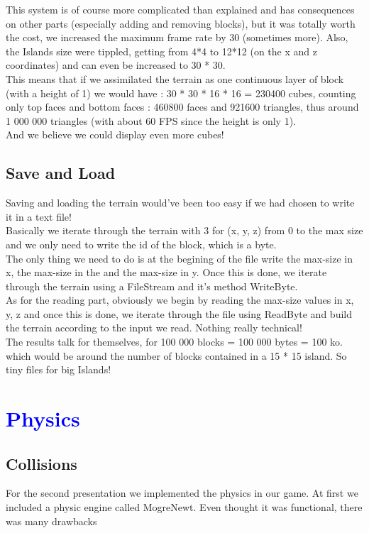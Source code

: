 \documentclass[article]{report}         %
\begin{document}
          This system is of course more complicated than explained and has consequences on other parts (especially adding and removing blocks), but it was totally worth the cost, we increased the maximum  frame rate by 30 (sometimes more). Also, the Islands size were tippled, getting from 4*4 to 12*12 (on the x and z coordinates) and can even be increased to 30 * 30.\\
          This means that if we assimilated the terrain as one continuous layer of block (with a height of 1) we would have : 30 * 30 * 16 * 16 = 230400 cubes, counting only top faces and bottom faces : 460800 faces and 921600 triangles, thus around 1 000 000 triangles (with about 60 FPS since the height is only 1).\\
          And we believe we could display even more cubes!\\

      \section{Save and Load}
        Saving and loading the terrain would've been too easy if we had chosen to write it in a text file!\\
        Basically we iterate through the terrain with 3 for (x, y, z) from 0 to the max size and we only need to write the id of the block, which is a byte.\\
        The only thing we need to do is at the begining of the file write the max-size in x, the max-size in the and the max-size in y. Once this is done, we iterate through the terrain using a FileStream and it's method WriteByte.\\

        As for the reading part, obviously we begin by reading the max-size values in x, y, z and once this is done, we iterate through the file using ReadByte and build the terrain according to the input we read. Nothing really technical!\\
      
       The results talk for themselves, for 100 000 blocks = 100 000 bytes = 100 ko. which would be around the number of blocks contained in a 15 * 15 island. So tiny files for big Islands!\\

    \chapter{\textcolor{blue}{Physics}}
      \section{Collisions}
For the second presentation we implemented the physics in our game. At first we included a physic engine called MogreNewt. Even thought it was functional, there was many drawbacks\\
\end{document}
